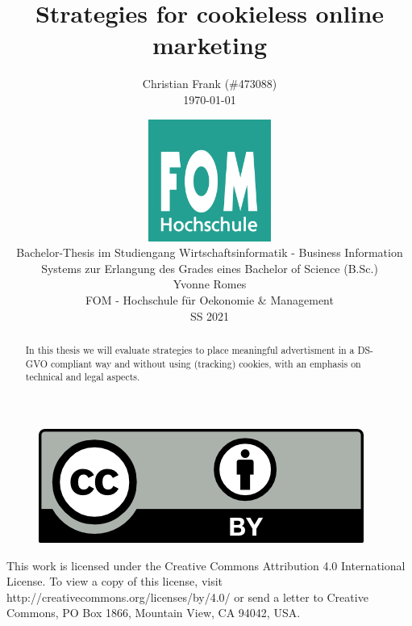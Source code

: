 \documentclass[12pt,a4paper,listof=totoc,bibliography=totoc]{scrartcl}
\newcommand\svthema{Strategies for cookieless online marketing}
\newcommand\svperson{Christian Frank (\#473088)}
\newcommand\svdatum{\today}
\newcommand\lvname{Bachelor-Thesis im Studiengang Wirtschaftsinformatik - Business Information Systems zur Erlangung des Grades eines Bachelor of Science (B.Sc.)}
\newcommand\lvtyp{SS 2021}
\newcommand\lvinst{FOM - Hochschule für Oekonomie \& Management}
\newcommand\lvbetr{Yvonne Romes}
\begin{document}
\title{ \huge\textbf{\svthema} }
\author{ {\svperson} \\ \svdatum }
\date{ \normalsize \centering \includegraphics[width=0.3\textwidth]{FOM}\\ {\lvname} \\ {\lvbetr} \\ {\lvinst} \\ {\lvtyp} }

\pagestyle{fancy}
\fancyhf{}
\fancyhf[ch]{\thepage}
\renewcommand\headrulewidth{0pt}

\maketitle
\thispagestyle{empty} %

\begin{abstract}
In this thesis we will evaluate strategies to place meaningful advertisment in a DS-GVO compliant way and without using (tracking) cookies, with an emphasis on technical and legal aspects.

\end{abstract}

\vfill
\begin{figure}[h]
    \centering
    \includegraphics[]{CC-BY}
\end{figure}

This work is licensed under the Creative Commons Attribution 4.0 International License. To view a copy of this license, visit http://creativecommons.org/licenses/by/4.0/ or send a letter to Creative Commons, PO Box 1866, Mountain View, CA 94042, USA.
\end{document}
